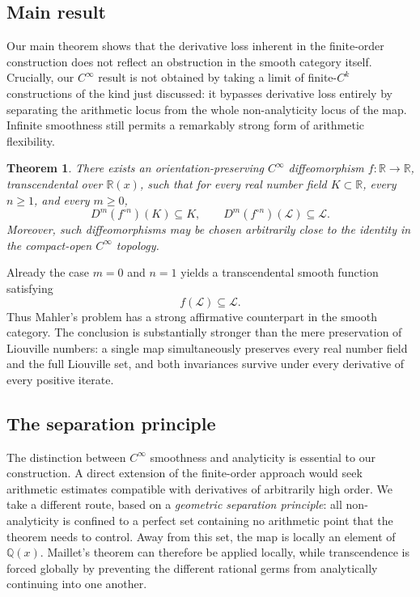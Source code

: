 \documentclass[11pt,reqno]{amsart}
\numberwithin{equation}{section}
\newtheorem{theorem}{Theorem}[section]
\theoremstyle{definition}
\theoremstyle{remark}
\newcommand{\R}{\mathbb R}
\newcommand{\Q}{\mathbb Q}
\newcommand{\Lio}{\mathscr L}
\begin{document}
\subsection*{Main result}

Our main theorem shows that the derivative loss inherent in the
finite-order construction does not reflect an obstruction in the smooth
category itself. Crucially, our $C^\infty$ result is not obtained by taking
a limit of finite-$C^k$ constructions of the kind just discussed: it
bypasses derivative loss entirely by separating the arithmetic locus from
the whole non-analyticity locus of the map. Infinite smoothness still
permits a remarkably strong form of arithmetic flexibility.

\begin{theorem}\label{thm:headline}
There exists an orientation-preserving $C^\infty$ diffeomorphism $f:\R\to\R$, transcendental over $\R(x)$, such that for every real number field $K\subset\R$, every $n\geq1$, and every $m\geq0$,
\[
D^m(f^{\circ n})(K)\subseteq K,
\qquad
D^m(f^{\circ n})(\Lio)\subseteq\Lio.
\]
Moreover, such diffeomorphisms may be chosen arbitrarily close to the identity in the compact-open $C^\infty$ topology.
\end{theorem}

Already the case $m=0$ and $n=1$ yields a transcendental smooth function
satisfying
\[
f(\Lio)\subseteq\Lio.
\]
Thus Mahler's problem has a strong affirmative counterpart in the smooth
category. The conclusion is substantially stronger than the mere preservation of
Liouville numbers: a single map simultaneously preserves every real number
field and the full Liouville set, and both invariances survive under every
derivative of every positive iterate.

\subsection*{The separation principle}

The distinction between $C^\infty$ smoothness and analyticity is essential
to our construction. A direct extension of the finite-order approach would
seek arithmetic estimates compatible with derivatives of arbitrarily high
order. We take a different route, based on a \emph{geometric separation
principle}: all non-analyticity is confined to a perfect set containing no
arithmetic point that the theorem needs to control. Away from this set, the
map is locally an element of $\Q(x)$. Maillet's theorem can therefore be
applied locally, while transcendence is forced globally by preventing the
different rational germs from analytically continuing into one another.
\end{document}
